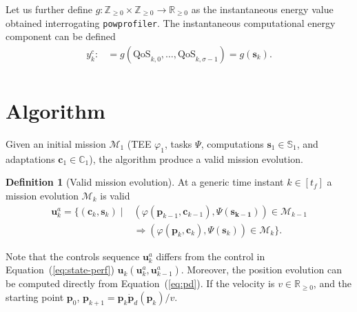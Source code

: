\documentclass[letterpaper,10pt,conference]{ieeeconf}
\newcommand{\stt}[1]{{\small\tt #1}} %
\newcommand{\powprof}{\stt{powprofiler}}
\theoremstyle{definition}
\newtheorem{defn}{Definition}[section]
\begin{document}
Let us further define $g:\mathbb{Z}_{\geq 0}\times\mathbb{Z}_{\geq 0}\rightarrow\mathbb{R}_{\geq 0}$ as the instantaneous energy value obtained interrogating \powprof{}. The instantaneous computational energy component can be defined
\begin{equation}\label{eq:energy-comp}\begin{split}
  y_k^c:&=g\left(\text{QoS}_{k,0},\dots,\text{QoS}_{k,\sigma-1}\right)=g\left(\mathbf{s}_{k}\right).\\
\end{split}\end{equation}


\section{Algorithm}
\label{sec:algo}


Given an initial mission $\mathcal{M}_1$ (TEE $\varphi_1$, tasks $\Psi$, computations $\mathbf{s}_1\in\mathbb{S}_1$, and adaptations $\mathbf{c}_1\in\mathbb{C}_1$), the algorithm produce a valid mission evolution.

\begin{defn}[Valid mission evolution]\label{def:valid}
  At a generic time instant $k\in[t_f]$ a mission evolution $\mathcal{M}_{k}$ is valid
  \begin{equation}\begin{split}
    \mathbf{u}^a_{k}=\{(\mathbf{c}_{k},\mathbf{s}_{k})\mid&(\varphi(\mathbf{p}_{k-1},\mathbf{c}_{k-1}),\Psi(\mathbf{s_{k-1}}))\in\mathcal{M}_{k-1}\\
    &\Longrightarrow(\varphi(\mathbf{p}_{k},\mathbf{c}_{k}),\Psi(\mathbf{s}_{k}))\in\mathcal{M}_{k}\}.
  \end{split}\end{equation}
\end{defn}

Note that the controls sequence $\mathbf{u}_k^a$ differs from the control in Equation~(\ref{eq:state-perf}) $\mathbf{u}_k(\mathbf{u}_k^a,\mathbf{u}_{k-1}^a)$. Moreover, the position evolution can be computed directly from Equation~(\ref{eq:pd}). If the velocity is $v\in\mathbb{R}_{\geq 0}$, and the starting point $\mathbf{p}_0$, $\mathbf{p}_{k+1}=\mathbf{p}_k\dot{\mathbf{p}}_d(\mathbf{p}_k)/v$.
\end{document}
